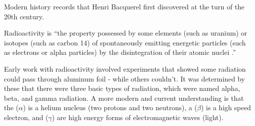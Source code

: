 Modern history records that Henri Bacquerel first discovered  \cite{Strom Advanced General Chemistry} at the turn of the 20th century.

\begin{defn}[]{Radioactivity}
	 is ``the property possessed by some elements (such as uranium) or isotopes (such as carbon 14) of spontaneously emitting energetic particles (such as electrons or alpha particles) by the disintegration of their atomic nuclei \cite{Dictionary}.''
\end{defn}

Early work with radioactivity involved experiments that showed some radiation could pass through aluminum foil - while others couldn't. It was determined by these that there were three basic types of radiation, which were named alpha, beta, and gamma radiation. A more modern and current understanding is that the  ($\alpha$) is a helium nucleus (two protons and two neutrons), a  ($\beta$) is a high speed electron, and  ($\gamma$) are high energy forms of electromagnetic waves (light).



















